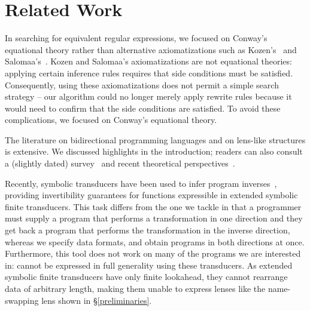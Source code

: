 \documentclass[acmsmall,screen]{acmart}
\begin{document}



\section{Related Work}
\label{sec:related}

\ifdraft\else {}
\fi

In searching for equivalent regular expressions, we focused on
Conway's equational theory rather than
alternative axiomatizations such as Kozen's~\cite{kozen-complete}
and Salomaa's~\cite{salomaa-complete}.  Kozen and Salomaa's
axiomatizations are not equational theories: applying certain
inference rules requires that side conditions must be satisfied.  
Consequently, using these
axiomatizations does not permit a simple search strategy -- our
algorithm could no longer merely apply rewrite rules because it would
need to confirm that the side conditions
are satisfied. To avoid these complications, we focused on 
Conway's equational theory.

The literature on bidirectional programming languages
and on lens-like structures is extensive.  We discussed
highlights in the introduction; readers can also
consult a (slightly dated)
survey~\cite{DBLP:conf/icmt/CzarneckiFHLST09} and
recent theoretical perspectives~\cite{DBLP:journals/chinaf/FischerHP15,
  DBLP:conf/birthday/Abou-SalehCGMS16}.

Recently, symbolic transducers have been used to infer program
inverses~\cite{program-inversion-symbolic-transducers}, providing
invertibility guarantees for functions expressible in extended
symbolic finite transducers. This task differs from the one we tackle in that a
programmer must supply a program that performs a transformation in one direction
and they get back a program that performs the transformation in the inverse
direction, whereas we specify data formats, and obtain programs in both
directions at once. Furthermore, this tool
does not work on many of the programs we are interested in: \SwapLens{} cannot
be expressed in full generality using these transducers.  As extended symbolic
finite transducers have only finite lookahead, they cannot rearrange data of
arbitrary length, making them unable to express lenses like the name-swapping
lens shown in \S\ref{preliminaries}.
\end{document}
